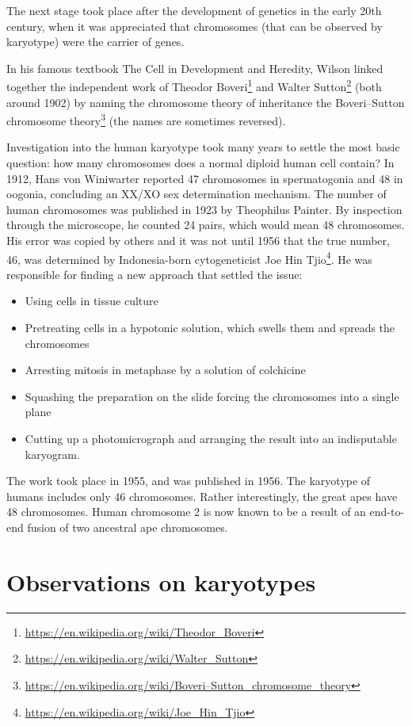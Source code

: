 \documentclass[]{book}
\providecommand{\tightlist}{%
  \setlength{\itemsep}{0pt}\setlength{\parskip}{0pt}}
\let\rmarkdownfootnote\footnote%
\def\footnote{\protect\rmarkdownfootnote}
\renewcommand{\href}[2]{#2\footnote{\url{#1}}}
\theoremstyle{definition}
\theoremstyle{definition}
\theoremstyle{definition}
\theoremstyle{remark}
\begin{document}
The next stage took place after the development of genetics in the early
20th century, when it was appreciated that chromosomes (that can be
observed by karyotype) were the carrier of genes.

In his famous textbook The Cell in Development and Heredity, Wilson
linked together the independent work of
\href{https://en.wikipedia.org/wiki/Theodor_Boveri}{Theodor Boveri} and
\href{https://en.wikipedia.org/wiki/Walter_Sutton}{Walter Sutton} (both
around 1902) by naming the chromosome theory of inheritance the
\href{https://en.wikipedia.org/wiki/Boveri–Sutton_chromosome_theory}{Boveri--Sutton
chromosome theory} (the names are sometimes reversed).

Investigation into the human karyotype took many years to settle the
most basic question: how many chromosomes does a normal diploid human
cell contain? In 1912, Hans von Winiwarter reported 47 chromosomes in
spermatogonia and 48 in oogonia, concluding an XX/XO sex determination
mechanism. The number of human chromosomes was published in 1923 by
Theophilus Painter. By inspection through the microscope, he counted 24
pairs, which would mean 48 chromosomes. His error was copied by others
and it was not until 1956 that the true number, 46, was determined by
Indonesia-born cytogeneticist
\href{https://en.wikipedia.org/wiki/Joe_Hin_Tjio}{Joe Hin Tjio}. He was
responsible for finding a new approach that settled the issue:

\begin{itemize}
\tightlist
\item
  Using cells in tissue culture
\item
  Pretreating cells in a hypotonic solution, which swells them and
  spreads the chromosomes
\item
  Arresting mitosis in metaphase by a solution of colchicine
\item
  Squashing the preparation on the slide forcing the chromosomes into a
  single plane
\item
  Cutting up a photomicrograph and arranging the result into an
  indisputable karyogram.
\end{itemize}

The work took place in 1955, and was published in 1956. The karyotype of
humans includes only 46 chromosomes. Rather interestingly, the great
apes have 48 chromosomes. Human chromosome 2 is now known to be a result
of an end-to-end fusion of two ancestral ape chromosomes.

\section{Observations on karyotypes}\label{observations-on-karyotypes}
\end{document}
